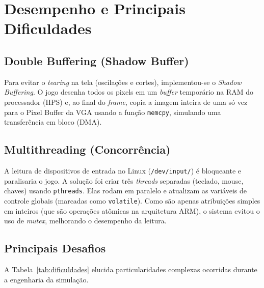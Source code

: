 \documentclass[10pt,twocolumn,letterpaper]{article}
\begin{document}
\section{Desempenho e Principais Dificuldades}

\subsection{Double Buffering (Shadow Buffer)}
Para evitar o \textit{tearing} na tela (oscilações e cortes), implementou-se o \textit{Shadow Buffering}. O jogo desenha todos os pixels em um \textit{buffer} temporário na RAM do processador (HPS) e, ao final do \textit{frame}, copia a imagem inteira de uma só vez para o Pixel Buffer da VGA usando a função \texttt{memcpy}, simulando uma transferência em bloco (DMA).

\subsection{Multithreading (Concorrência)}
A leitura de dispositivos de entrada no Linux (\texttt{/dev/input/}) é bloqueante e paralisaria o jogo. A solução foi criar três \textit{threads} separadas (teclado, mouse, chaves) usando \texttt{pthreads}. Elas rodam em paralelo e atualizam as variáveis de controle globais (marcadas como \texttt{volatile}). Como são apenas atribuições simples em inteiros (que são operações atômicas na arquitetura ARM), o sistema evitou o uso de \textit{mutex}, melhorando o desempenho da leitura.

\subsection{Principais Desafios}
A Tabela~\ref{tab:dificuldades} elucida particularidades complexas ocorridas durante a engenharia da simulação.
\end{document}
